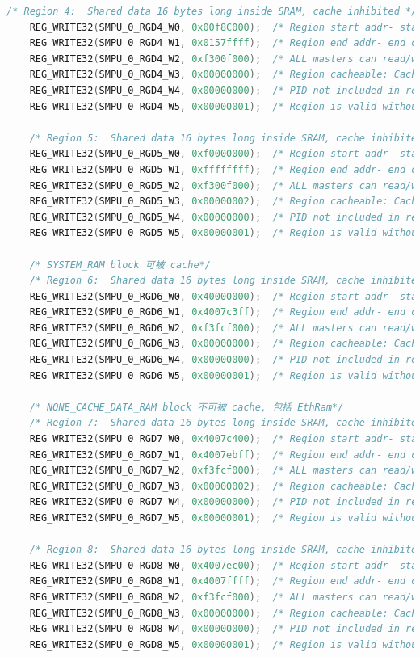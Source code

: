 \begin{lstlisting}[language=C,style=C]
    /* Region 4:  Shared data 16 bytes long inside SRAM, cache inhibited */
    REG_WRITE32(SMPU_0_RGD4_W0, 0x00f8C000);  /* Region start addr- start of SRAM */
    REG_WRITE32(SMPU_0_RGD4_W1, 0x0157ffff);  /* Region end addr- end of SRAM  */
    REG_WRITE32(SMPU_0_RGD4_W2, 0xf300f000);  /* ALL masters can read/write */
    REG_WRITE32(SMPU_0_RGD4_W3, 0x00000000);  /* Region cacheable: Cache Inhibit=0*/
    REG_WRITE32(SMPU_0_RGD4_W4, 0x00000000);  /* PID not included in region eval. */
    REG_WRITE32(SMPU_0_RGD4_W5, 0x00000001);  /* Region is valid without lock */

    /* Region 5:  Shared data 16 bytes long inside SRAM, cache inhibited */
    REG_WRITE32(SMPU_0_RGD5_W0, 0xf0000000);  /* Region start addr- start of SRAM */
    REG_WRITE32(SMPU_0_RGD5_W1, 0xffffffff);  /* Region end addr- end of SRAM  */
    REG_WRITE32(SMPU_0_RGD5_W2, 0xf300f000);  /* ALL masters can read/write 0xf300f000*/
    REG_WRITE32(SMPU_0_RGD5_W3, 0x00000002);  /* Region cacheable: Cache Inhibit=0*/
    REG_WRITE32(SMPU_0_RGD5_W4, 0x00000000);  /* PID not included in region eval. */
    REG_WRITE32(SMPU_0_RGD5_W5, 0x00000001);  /* Region is valid without lock */

    /* SYSTEM_RAM block 可被 cache*/
    /* Region 6:  Shared data 16 bytes long inside SRAM, cache inhibited */
    REG_WRITE32(SMPU_0_RGD6_W0, 0x40000000);  /* Region start addr- start of SRAM */
    REG_WRITE32(SMPU_0_RGD6_W1, 0x4007c3ff);  /* Region end addr- end of SRAM  */
    REG_WRITE32(SMPU_0_RGD6_W2, 0xf3fcf000);  /* ALL masters can read/write- 0xc3fcf000 */
    REG_WRITE32(SMPU_0_RGD6_W3, 0x00000000);  /* Region cacheable: Cache Inhibit=0*/
    REG_WRITE32(SMPU_0_RGD6_W4, 0x00000000);  /* PID not included in region eval. */
    REG_WRITE32(SMPU_0_RGD6_W5, 0x00000001);  /* Region is valid without lock */

    /* NONE_CACHE_DATA_RAM block 不可被 cache, 包括 EthRam*/
    /* Region 7:  Shared data 16 bytes long inside SRAM, cache inhibited */
    REG_WRITE32(SMPU_0_RGD7_W0, 0x4007c400);  /* Region start addr- start of SRAM 0x4007e400*/
    REG_WRITE32(SMPU_0_RGD7_W1, 0x4007ebff);  /* Region end addr- end of SRAM  */
    REG_WRITE32(SMPU_0_RGD7_W2, 0xf3fcf000);  /* ALL masters can read/write- 0xc3fcf000 */
    REG_WRITE32(SMPU_0_RGD7_W3, 0x00000002);  /* Region cacheable: Cache Inhibit=0*/
    REG_WRITE32(SMPU_0_RGD7_W4, 0x00000000);  /* PID not included in region eval. */
    REG_WRITE32(SMPU_0_RGD7_W5, 0x00000001);  /* Region is valid without lock */

    /* Region 8:  Shared data 16 bytes long inside SRAM, cache inhibited */
    REG_WRITE32(SMPU_0_RGD8_W0, 0x4007ec00);  /* Region start addr- start of SRAM */
    REG_WRITE32(SMPU_0_RGD8_W1, 0x4007ffff);  /* Region end addr- end of SRAM  */
    REG_WRITE32(SMPU_0_RGD8_W2, 0xf3fcf000);  /* ALL masters can read/write- 0xc3fcf000 */
    REG_WRITE32(SMPU_0_RGD8_W3, 0x00000000);  /* Region cacheable: Cache Inhibit=0*/
    REG_WRITE32(SMPU_0_RGD8_W4, 0x00000000);  /* PID not included in region eval. */
    REG_WRITE32(SMPU_0_RGD8_W5, 0x00000001);  /* Region is valid without lock */


\end{lstlisting}
